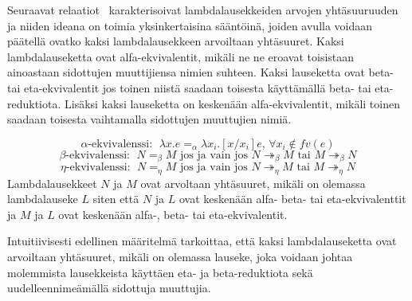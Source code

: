 Seuraavat relaatiot~\cite[s.~23--24]{HBEB2000} karakterisoivat lambdalausekkeiden arvojen yhtäsuuruuden ja niiden ideana on toimia yksinkertaisina sääntöinä, joiden avulla voidaan päätellä ovatko kaksi lambdalausekkeen arvoiltaan yhtäsuuret. Kaksi lambdalauseketta ovat alfa-ekvivalentit, mikäli ne ne eroavat toisistaan ainoastaan sidottujen muuttijiensa nimien suhteen. Kaksi lauseketta ovat beta- tai eta-ekvivalentit jos toinen niistä saadaan toisesta käyttämällä beta- tai eta-reduktiota. Lisäksi kaksi lauseketta on keskenään alfa-ekvivalentit, mikäli toinen saadaan toisesta vaihtamalla sidottujen muuttujien nimiä.

\begin{maar}
		 
\[ 
	\alpha \text{-ekvivalenssi: } \; \lambda x.e =_{\alpha} \lambda x_{i}.		[x/x_{i}]e \text{,  } \forall x_{i} \notin fv(e) 
\]
\[ 
	\beta \text{-ekvivalenssi: } \; N =_{\beta} M \text{ jos ja vain jos } N 		\twoheadrightarrow_{\beta} M \text{ tai }
	M \twoheadrightarrow_{\beta} N 
\]
\[ 
	\eta \text{-ekvivalenssi: } \; N =_{\eta} M \text{ jos ja vain jos } N 		\twoheadrightarrow_{\eta} M \text{ tai }
	M \twoheadrightarrow_{\eta} N 
\]
Lambdalausekkeet $N$ ja $M$ ovat arvoltaan yhtäsuuret, mikäli	on olemassa lambdalauseke $L$ siten että $N$ ja $L$ ovat keskenään alfa- beta- tai eta-ekvivalenttit ja $M$ ja $L$ ovat keskenään alfa-, beta- tai eta-ekvivalentit.	
\end{maar}

Intuitiivisesti edellinen määritelmä tarkoittaa, että kaksi lambdalauseketta ovat arvoiltaan yhtäsuuret, mikäli on olemassa lauseke, joka voidaan johtaa molemmista lausekkeista käyttäen eta- ja beta-reduktiota sekä uudelleennimeämällä sidottuja muuttujia. 


 
